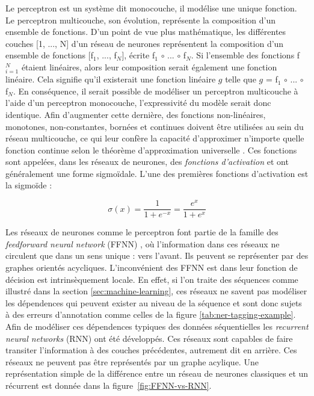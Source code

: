 \documentclass[PhD-Yoann-Dupont.tex]{subfiles}
\begin{document}
Le perceptron est un système dit monocouche, il modélise une unique fonction. Le perceptron multicouche, son évolution, représente la composition d'un ensemble de fonctions. D'un point de vue plus mathématique, les différentes couches [1, ..., N] d'un réseau de neurones représentent la composition d'un ensemble de fonctions [f$_{1}$, ..., f$_{N}$], écrite f$_{1}$ $\circ$ ... $\circ$ f$_{N}$. Si l'ensemble des fonctions f$^{N}_{i=1}$ étaient linéaires, alors leur composition serait également une fonction linéaire. Cela signifie qu'il existerait une fonction linéaire $g$ telle que $g$ = f$_{1}$ $\circ$ ... $\circ$ f$_{N}$. En conséquence, il serait possible de modéliser un perceptron multicouche à l'aide d'un perceptron monocouche, l'expressivité du modèle serait donc identique. Afin d'augmenter cette dernière, des fonctions non-linéaires, monotones, non-constantes, bornées et continues doivent être utilisées au sein du réseau multicouche, ce qui leur confère la capacité d'approximer n'importe quelle fonction continue selon le théorème d'approximation universelle \citet{cybenko1989approximation,hornik1991approximation}. Ces fonctions sont appelées, dans les réseaux de neurones, des \emph{fonctions d'activation} et ont généralement une forme sigmoïdale. L'une des premières fonctions d'activation est la sigmoïde :

\begin{equation}\label{eq:sigmoid}
\sigma(x) = \frac{1}{1 + e^{-x}} = \frac{e^{x}}{1 + e^{x}}
\end{equation}

Les réseaux de neurones comme le perceptron font partie de la famille des \emph{feedforward neural network} (FFNN) \citep{rosenblatt1958perceptron,svozil1997introduction}, où l'information dans ces réseaux ne circulent que dans un sens unique : vers l'avant. Ils peuvent se représenter par des graphes orientés acycliques.
L'inconvénient des FFNN est dans leur fonction de décision est intrinsèquement locale. En effet, si l'on traite des séquences comme illustré dans la section \ref{sec:machine-learning}, ces réseaux ne savent pas modéliser les dépendences qui peuvent exister au niveau de la séquence et sont donc sujets à des erreurs d'annotation comme celles de la figure \ref{tab:ner-tagging-example}.
Afin de modéliser ces dépendences typiques des données séquentielles les \emph{recurrent neural networks} (RNN) \citep{elman1990finding,mandic2001recurrent} ont été développés. Ces réseaux sont capables de faire transiter l'information à des couches précédentes, autrement dit en arrière. Ces réseaux ne peuvent pas être représentés par un graphe acylique. Une représentation simple de la différence entre un réseau de neurones classiques et un récurrent est donnée dans la figure\ \ref{fig:FFNN-vs-RNN}.
\end{document}
